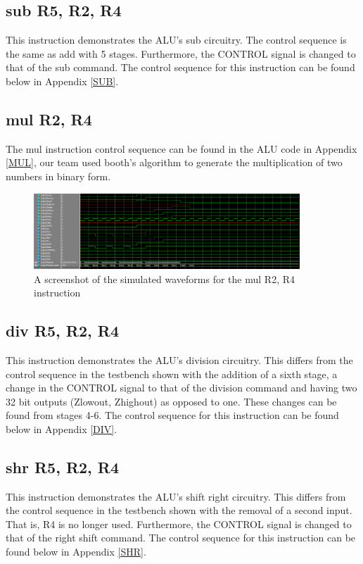 \documentclass{article}
\begin{document}
    \subsection{sub R5, R2, R4}
     This instruction demonstrates the ALU's sub circuitry. The control sequence is the same as add with 5 stages. Furthermore, the CONTROL signal is changed to that of the sub command. The control sequence for this instruction can be found below in Appendix \ref{SUB}.
    \subsection{mul R2, R4}
    
    The mul instruction control sequence can be found in the ALU code in Appendix \ref{MUL}, our team used booth's algorithm to generate the multiplication of two numbers in binary form. 
    
    \begin{figure}
        \begin{center}
            \includegraphics[width=10cm]{mul}
            \caption{A screenshot of the simulated waveforms for the mul R2, R4 instruction}
        \end{center}
    \end{figure}

    \subsection{div R5, R2, R4}
    
    This instruction demonstrates the ALU's division circuitry. This differs from the control sequence in the testbench shown with the addition of a sixth stage, a change in the CONTROL signal to that of the division command and having two 32 bit outputs (Zlowout, Zhighout) as opposed to one. These changes can be found from stages 4-6. The control sequence for this instruction can be found below in Appendix \ref{DIV}.

    \subsection{shr R5, R2, R4}
    This instruction demonstrates the ALU's shift right circuitry. This differs from the control sequence in the testbench shown with the removal of a second input. That is, R4 is no longer used. Furthermore, the CONTROL signal is changed to that of the right shift command. The control sequence for this instruction can be found below in Appendix \ref{SHR}.
    
\end{document}
